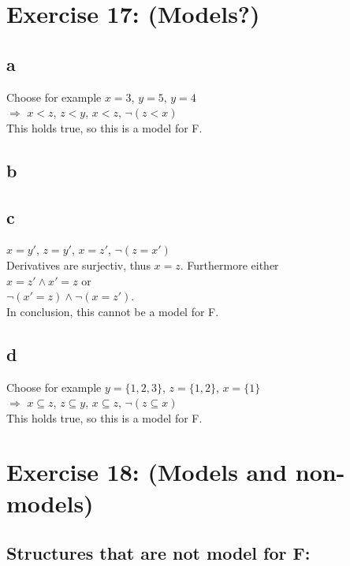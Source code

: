 \documentclass[12pt]{article}
\begin{document}
 

\rhead{\today}


\section*{Exercise 17: (Models?)}

\subsection*{a}

Choose for example $x=3$, $y=5$, $y=4$\\
$\Rightarrow$ $x<z$, $z<y$, $x<z$, $\lnot (z < x)$\\
This holds true, so this is a model for F.

\subsection*{b}



\subsection*{c}

$x=y'$, $z=y'$, $x=z'$, $\lnot(z=x')$\\
Derivatives are surjectiv, thus $x=z$. Furthermore either\\
$x=z' \land x'=z$ or\\
$\lnot(x'=z) \land \lnot(x=z')$.\\
In conclusion, this cannot be a model for F.

\subsection*{d}

Choose for example $y = \{1,2,3\}$, $z=\{1,2\}$, $x=\{1\}$\\
$\Rightarrow$ $x \subseteq z$, $z \subseteq y$, $x \subseteq z$, $\lnot (z \subseteq x)$\\
This holds true, so this is a model for F.

\section*{Exercise 18: (Models and non-models)}

\subsection*{Structures that are not model for F:}
\end{document}
